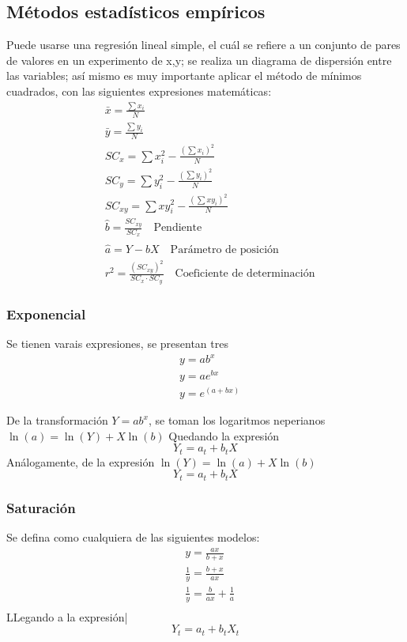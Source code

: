 \subsection{Métodos estadísticos empíricos}
Puede usarse una regresión lineal simple, el cuál se refiere a un conjunto de pares de valores en un experimento de x,y; se realiza un diagrama de dispersión entre las variables; así mismo es muy importante aplicar el método de mínimos cuadrados, con las siguientes expresiones matemáticas:
\begin{align*}
    &\bar{x} = \frac{\sum x_i}{N}\\
    &\bar{y} = \frac{\sum y_i}{N}\\
    &SC_x = \sum x_i^2 - \frac{\left(\sum x_i\right)^2}{N}\\
    &SC_y = \sum y_i^2 - \frac{\left(\sum y_i\right)^2}{N}\\
    &SC_{xy} = \sum xy_i^2 - \frac{\left(\sum xy_i\right)^2}{N}\\
    &\hat{b} = \frac{SC_{xy}}{SC_x}\quad \text{Pendiente}   \\ 
    &\hat{a} = Y - \hat{b}X\quad \text{Parámetro de posición} \\
    &r^2 = \frac{\left(SC_{xy}\right)^2}{SC_x\cdot SC_y}\quad \text{Coeficiente de determinación}
\end{align*}
\subsubsection{Exponencial}
Se tienen varais expresiones, se presentan tres
\begin{align}
    &y = ab^x\\
    &y = ae^{bx}\\
    &y = e^{\left(a + bx\right)}
\end{align}

De la transformación $Y=ab^x$, se toman los logaritmos neperianos $\ln{(a)}=\ln{(Y)}+X\ln{(b)}$
Quedando la expresión
\begin{equation}
    Y_t = a_t + b_tX
\end{equation}
Análogamente, de la expresión $\ln{(Y)}=\ln{(a)}+X\ln{(b)}$
\begin{equation}
    Y_t =a_t + b_tX
\end{equation}

\subsubsection{Saturación}
Se defina como cualquiera de las siguientes modelos:
\begin{align*}
    &y = \frac{ax}{b + x}\\
    &\frac{1}{y} = \frac{b + x}{ax}\\
    &\frac{1}{y} = \frac{b}{ax} + \frac{1}{a}\\
\end{align*}
LLegando a la expresión|
\begin{equation}
    Y_t = a_t + b_tX_t
\end{equation}

